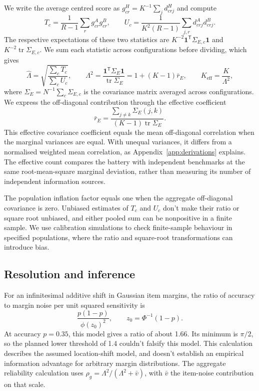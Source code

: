 \documentclass{article}
\newcommand{\Lam}{\Lambda}
\newcommand{\Sig}{\Sigma_E}
\begin{document}
We write the average centred score as $g^H_{cr}=K^{-1}\sum_j d^H_{crj}$ and compute
\begin{equation}
T_c=\frac{1}{R-1}\sum_r g^A_{cr}g^B_{cr},\qquad
U_c=\frac{1}{K^2(R-1)}\sum_{j,r}d^A_{crj}d^B_{crj}.
\label{eq:tu}
\end{equation}
The respective expectations of these two statistics are $K^{-2}\mathbf{1}^{\mathsf T}\Sigma_{E,c}\mathbf{1}$ and $K^{-2}\operatorname{tr}\Sigma_{E,c}$. We sum each statistic across configurations before dividing, which gives
\begin{equation}
\widehat\Lam=\sqrt{\frac{\sum_c T_c}{\sum_c U_c}},\qquad
\Lam^2=\frac{\mathbf{1}^{\mathsf T}\Sig\mathbf{1}}{\operatorname{tr}\Sig}
=1+(K-1)\bar r_E,\qquad K_{\mathrm{eff}}=\frac{K}{\Lam^2},
\label{eq:lambda}
\end{equation}
where $\Sig=N^{-1}\sum_c\Sigma_{E,c}$ is the covariance matrix averaged across configurations. We express the off-diagonal contribution through the effective coefficient
\begin{equation}
\bar r_E=\frac{\sum_{j\ne k}\Sigma_E(j,k)}{(K-1)\operatorname{tr}\Sig}.
\label{eq:effective}
\end{equation}
This effective covariance coefficient equals the mean off-diagonal correlation when the marginal variances are equal. With unequal variances, it differs from a normalised weighted mean correlation, as Appendix~\ref{app:derivations} explains. The effective count compares the battery with independent benchmarks at the same root-mean-square marginal deviation, rather than measuring its number of independent information sources.

The population inflation factor equals one when the aggregate off-diagonal covariance is zero. Unbiased estimates of $T_c$ and $U_c$ don't make their ratio or square root unbiased, and either pooled sum can be nonpositive in a finite sample. We use calibration simulations to check finite-sample behaviour in specified populations, where the ratio and square-root transformations can introduce bias.

\subsection{Resolution and inference}
For an infinitesimal additive shift in Gaussian item margins, the ratio of accuracy to margin noise per unit squared sensitivity is
\begin{equation}
\frac{p(1-p)}{\phi(z_0)^2},\qquad z_0=\Phi^{-1}(1-p).
\label{eq:information}
\end{equation}
At accuracy $p=0.35$, this model gives a ratio of about 1.66. Its minimum is $\pi/2$, so the planned lower threshold of 1.4 couldn't falsify this model. This calculation describes the assumed location-shift model, and doesn't establish an empirical information advantage for arbitrary margin distributions. The aggregate reliability calculation uses $\rho_g=\Lam^2/(\Lam^2+\bar v)$, with $\bar v$ the item-noise contribution on that scale.
\end{document}
